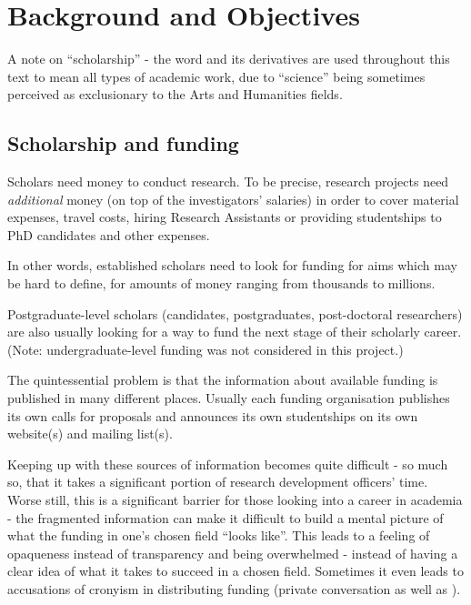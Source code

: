 \chapter{Background and Objectives}



A note on ``scholarship'' - the word and its derivatives are used throughout this text to mean all types of academic work, due to ``science'' being sometimes perceived as exclusionary to the Arts and Humanities fields.

\section{Scholarship and funding}
Scholars need money to conduct research. To be precise, research projects need \emph{additional} money (on top of the investigators' salaries) in order to cover material expenses, travel costs, hiring Research Assistants or providing studentships to PhD candidates and other expenses. 

In other words, established scholars need to look for funding for aims which may be hard to define, for amounts of money ranging from thousands to millions.

Postgraduate-level scholars (candidates, postgraduates, post-doctoral researchers) are also usually looking for a way to fund the next stage of their scholarly career. (Note: undergraduate-level funding was not considered in this project.)

The quintessential problem is that the information about available funding is published in many different places. Usually each funding organisation publishes its own calls for proposals and announces its own studentships on its own website(s) and mailing list(s).

Keeping up with these sources of information becomes quite difficult - so much so, that it takes a significant portion of research development officers' time. Worse still, this is a significant barrier for those looking into a career in academia - the fragmented information can make it difficult to build a mental picture of what the funding in one's chosen field ``looks like''. This leads to a feeling of opaqueness instead of transparency and being overwhelmed - instead of having a clear idea of what it takes to succeed in a chosen field. Sometimes it even leads to accusations of cronyism in distributing funding (private conversation as well as \cite{cronyism1, cronyism2}).


